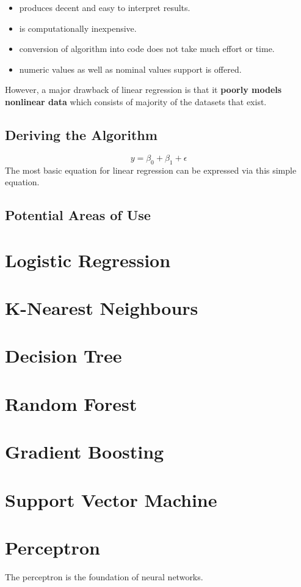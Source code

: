 \documentclass[12pt]{article}
\begin{document}
\begin{itemize}
  \item produces decent and  easy to interpret results.
  \item is computationally inexpensive.
  \item conversion of algorithm into code does not take much effort or time.
  \item numeric values as well as nominal values support is offered.
\end{itemize}

However, a major drawback of linear regression is that it \textbf{poorly models nonlinear data} which consists of majority of the datasets that exist.
\subsection{Deriving the Algorithm}

\begin{equation}
y = \beta_{0}+\beta_{1}+\epsilon
\end{equation}
The most basic equation for linear regression can be expressed via this simple equation.
\subsection{Potential Areas of Use}
\newpage
\section{Logistic Regression}
\newpage
\section{K-Nearest Neighbours}
\newpage
\section{Decision Tree}
\newpage
\section{Random Forest}
\newpage
\section{Gradient Boosting}
\newpage
\section{Support Vector Machine}
\newpage
\section{Perceptron}
The perceptron is the foundation of neural networks.
\newpage
\end{document}
